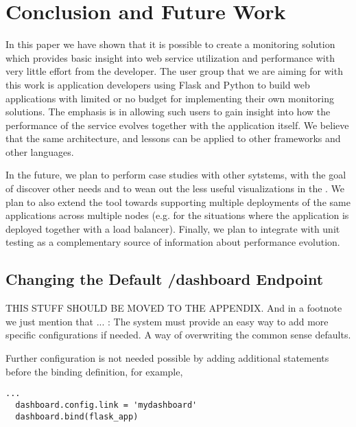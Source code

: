 \documentclass[conference]{IEEEtran}
\begin{document}





\section{Conclusion and Future Work}
\label{sec:conclusions}


In this paper we have shown that it is possible to create a monitoring solution which provides basic insight into web service utilization and performance  with very little effort from the developer. The user group that we are aiming for with this work is application developers using Flask and Python to build web applications with limited or no budget for implementing their own monitoring solutions. The emphasis is in allowing such users to gain insight into how the performance of the service evolves together with the application itself. We believe that the same architecture, and lessons can be applied to other frameworks and other languages.

In the future, we plan to perform case studies with other sytstems, with the goal of discover other needs and to wean out the less useful visualizations in the \tool. We plan to also extend the tool towards supporting multiple deployments of the same applications across multiple nodes (e.g. for the situations where the application is deployed together with a load balancer). Finally, we plan to integrate \tool with unit testing as a complementary source of information about performance evolution.



\newpage
\appendix

  \subsection{Changing the Default /dashboard Endpoint }

  THIS STUFF SHOULD BE MOVED TO THE APPENDIX. And in a footnote we just mention that ... : The system must provide an easy way to add more specific configurations if needed. A way of overwriting the common sense defaults.

  Further configuration is not needed possible by adding additional statements before the binding definition, for example,

  \begin{lstlisting}[style=custompython]
  ...
  dashboard.config.link = 'mydashboard'
  dashboard.bind(flask_app)
  \end{lstlisting}
  
\end{document}
